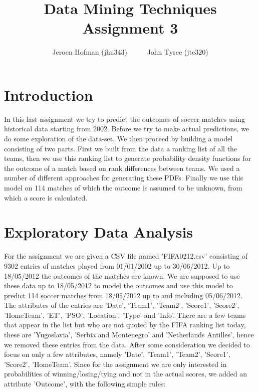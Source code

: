 \documentclass{llncs}
\author{Jeroen Hofman (jhn343) \ \ \ \ \ John Tyree (jte320)
\institute{Vrije Universiteit}}
\title{Data Mining Techniques\\
    Assignment 3}
\begin{document}
\maketitle
\captionsetup{width=0.8\textwidth}
\thispagestyle{empty}


\newpage

\section{Introduction}
In this last assignment we try to predict the outcomes of soccer matches using historical data starting from 2002. Before we try to make actual predictions, we do some exploration of the data-set. We then proceed by building a model consisting of two parts. First we built from the data a ranking list of all the teams, then we use this ranking list to generate probability density functions for the outcome of a match based on rank differences between teams. We used a number of different approaches for generating these PDFs. Finally we use this model on 114 matches of which the outcome is assumed to be unknown, from which a score is calculated.

\section{Exploratory Data Analysis}
For the assignment we are given a CSV file named 'FIFA0212.csv' consisting of 9302 entries of matches played from 01/01/2002 up to 30/06/2012. Up to 18/05/2012 the outcomes of the matches are known. We are supposed to use these data up to 18/05/2012 to model the outcomes and use this model to predict 114 soccer matches from 18/05/2012 up to and including 05/06/2012. The attributes of the entries are 'Date', `Team1', 'Team2', 'Score1', 'Score2', 'HomeTeam', 'ET', 'PSO', 'Location', 'Type' and 'Info'. There are a few teams that appear in the list but who are not quoted by the FIFA ranking list \cite{FIFAranking} today, these are 'Yugoslavia', 'Serbia and Montenegro' and 'Netherlands Antilles', hence we removed these entries from the data. After some consideration we decided to focus on only a few attributes, namely 'Date', 'Team1', 'Team2', 'Score1', 'Score2', 'HomeTeam'. Since for the assignment we are only interested in probabilities of winning/losing/tying and not in the actual scores, we added an attribute 'Outcome', with the following simple rules:
\end{document}
